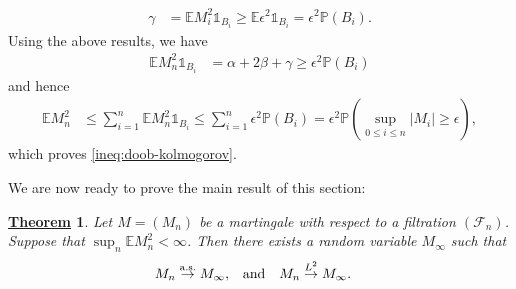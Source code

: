 \documentclass[12pt]{book}
\let\varepsilon\epsilon
\numberwithin{equation}{chapter}
\theoremstyle{plain}
\newtheorem{theorem}{\underline{Theorem}}
\numberwithin{theorem}{section}
\theoremstyle{definition}
\numberwithin{exercise}{chapter}
\let\oldendproof\endproof
\renewenvironment{proof}[1][\proofname]{%
  \oldproof[\scshape\underline{#1}]%
}{\oldendproof}
\newcommand{\<}{\langle}
\renewcommand{\>}{\rangle}
\renewcommand{\(}{\left(}
\renewcommand{\)}{\right)}
\renewcommand{\[}{\left[}
\renewcommand{\]}{\right]}
\newcommand\Eb{\mathds{E}}
\newcommand\Ib{\mathds{1}} 	%
\newcommand\Pb{\mathds{P}}
\newcommand\Fc{\mathscr{F}}
\newcommand\eps{\varepsilon}
\newcommand\gam{\gamma}
\begin{document}
\begin{proof}
\begin{align}
\gam
	&=	\Eb M_i^2 \Ib_{B_i}
	\geq \Eb \eps^2 \Ib_{B_i}
	=		\eps^2 \Pb( B_i ) .
\end{align}
Using the above results, we have
\begin{align}
\Eb M_n^2 \Ib_{B_i}
	&=	\alpha + 2 \beta + \gam
	\geq \eps^2 \Pb( B_i ) 
\end{align}
and hence
\begin{align}
\Eb M_n^2
	&\leq \sum_{i=1}^n \Eb M_n^2 \Ib_{B_i} 
	\leq \sum_{i=1}^n  \eps^2 \Pb( B_i ) 
	=	\eps^2 \Pb( \sup_{0 \leq i \leq n} |M_i| \geq \eps ) ,
\end{align}
which proves \eqref{ineq:doob-kolmogorov}.
\end{proof}

\noindent
We are now ready to prove the main result of this section:

\begin{theorem}
\label{thm:martingale.convergence}
Let $M = (M_n)$ be a martingale with respect to a filtration $(\Fc_n)$.  Suppose that $\sup_n \Eb M_n^2 < \infty$.  Then there exists a random variable $M_\infty$ such that 
\begin{align}
M_n
	&\stackrel{\textup{a.s.}}{\to} M_\infty , &
	&\text{and}&
M_n
	&\stackrel{L^2}{\to} M_\infty .
\end{align}  
\end{theorem}
\end{document}
